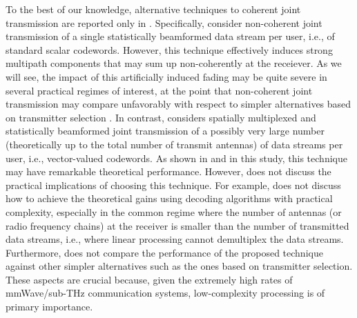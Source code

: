 \documentclass[10pt,journal,a4paper]{IEEEtran}
\begin{document}
To the best of our knowledge, alternative techniques to coherent joint transmission are reported only in \cite{tuninetti2016coverage,dandrea2021cell,buzzi2022beam,fettweis2020network}. Specifically, \cite{tuninetti2016coverage,dandrea2021cell,buzzi2022beam} consider non-coherent joint transmission of a single statistically beamformed data stream per user, i.e., of standard scalar codewords. However, this technique effectively induces strong multipath components that may sum up non-coherently at the receiever. As we will see, the impact of this artificially induced fading may be quite severe in several practical regimes of interest, at the point that non-coherent joint transmission may compare unfavorably with respect to simpler alternatives based on transmitter selection \cite{skouroumounis2017base,giordani2018control,gerasimenko2019capacity}. In contrast, \cite{fettweis2020network} considers spatially multiplexed and statistically beamformed joint transmission of a possibly very large number (theoretically up to the total number of transmit antennas) of data streams per user, i.e., vector-valued codewords. As shown in \cite{fettweis2020network} and in this study, this technique may have remarkable theoretical performance. However, \cite{fettweis2020network} does not discuss the practical implications of choosing this technique. For example, \cite{fettweis2020network} does not discuss how to achieve the theoretical gains using decoding algorithms with practical complexity, especially in the common regime where the number of antennas (or radio frequency chains) at the receiver is smaller than the number of transmitted data streams, i.e., where linear processing cannot demultiplex the data streams. Furthermore, \cite{fettweis2020network} does not compare the performance of the proposed technique against other simpler alternatives such as the ones based on transmitter selection. These aspects are crucial because, given the extremely high rates of mmWave/sub-THz communication systems, low-complexity processing is of primary importance.
\end{document}
